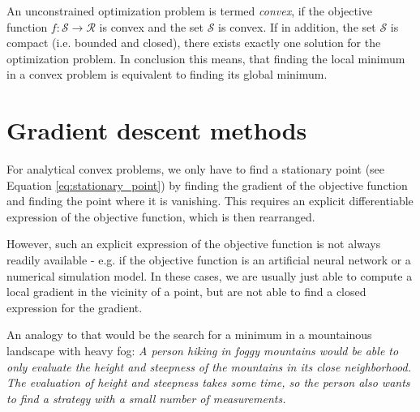 An unconstrained optimization problem is termed \emph{convex}, if the objective function $f: \mathcal{S} \rightarrow \mathcal{R}$ is convex and the set $\mathcal{S}$ is convex. If in addition, the set $\mathcal{S}$ is compact (i.e. bounded and closed), there exists exactly one solution for the optimization problem. In conclusion this means, that finding the local minimum in a convex problem is equivalent to finding its global minimum. 

\section{Gradient descent methods}
For analytical convex problems, we only have to find a stationary point (see Equation \ref{eq:stationary_point}) by finding the gradient of the objective function and finding the point where it is vanishing. This requires an explicit differentiable expression of the objective function, which is then rearranged.

However, such an explicit expression of the objective function is not always readily available - e.g. if the objective function is an artificial neural network or a numerical simulation model. In these cases, we are usually just able to compute a local gradient in the vicinity of a point, but are not able to find a closed expression for the gradient. 

An analogy to that would be the search for a minimum in a mountainous landscape with heavy fog: \emph{A person hiking in foggy mountains would be able to only evaluate the height and steepness of the mountains in its close neighborhood. The evaluation of height and steepness takes some time, so the person also wants to find a strategy with a small number of measurements.}

